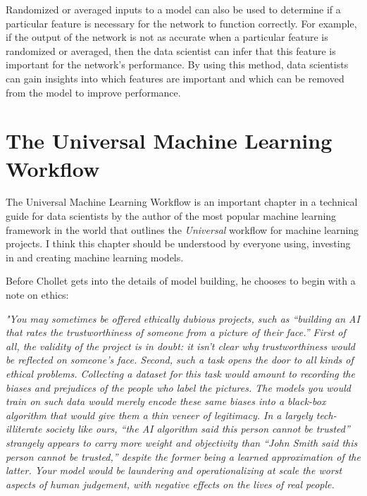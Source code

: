 Randomized or averaged inputs to a model can also be used to determine if a particular feature is necessary for the network to function correctly. For example, if the output of the network is not as accurate when a particular feature is randomized or averaged, then the data scientist can infer that this feature is important for the network’s performance. By using this method, data scientists can gain insights into which features are important and which can be removed from the model to improve performance.

\section{The Universal Machine Learning Workflow}

The Universal Machine Learning Workflow is an important chapter in a technical guide for data scientists  by the author of the most popular machine learning framework in the world that outlines the \textit{Universal} workflow for machine learning projects. I think this chapter should be understood by everyone using, investing in and creating machine learning models. 

Before Chollet gets into the details of model building, he chooses to begin with a note on ethics: 

\textit{"You may sometimes be offered ethically dubious projects, such as “building an AI that rates the trustworthiness of someone from a picture of their face.” First of all, the validity of the project is in doubt: it isn’t clear why trustworthiness would be reflected on someone’s face. Second, such a task opens the door to all kinds of ethical problems. Collecting a dataset for this task would amount to recording the biases and prejudices of the people who label the pictures. The models you would train on such data would merely encode these same biases into a black-box algorithm that would give them a thin veneer of legitimacy. In a largely tech-illiterate society like ours, “the AI algorithm said this person cannot be trusted” strangely appears to carry more weight and objectivity than “John Smith said this person cannot be trusted,” despite the former being a learned approximation of the latter. Your model would be laundering and operationalizing at scale the worst aspects of human judgement, with negative effects on the lives of real people.}

